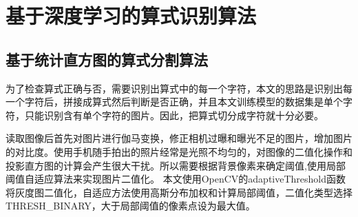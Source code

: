 \chapter{基于深度学习的算式识别算法}
\section{基于统计直方图的算式分割算法}
为了检查算式正确与否，需要识别出算式中的每一个字符，本文的思路是识别出每一个字符后，拼接成算式然后判断是否正确，并且本文训练模型的数据集是单个字符，只能识别含有单个字符的图片。因此，把算式切分成字符就十分必要。 
\par
读取图像后首先对图片进行伽马变换，修正相机过曝和曝光不足的图片，增加图片的对比度。使用手机随手拍出的照片经常是光照不均匀的，对图像的二值化操作和投影直方图的计算会产生很大干扰。所以需要根据背景像素来确定阈值,使用局部阈值自适应算法来实现图片二值化。 本文使用OpenCV的adaptiveThreshold函数将灰度图二值化，自适应方法使用高斯分布加权和计算局部阈值，二值化类型选择THRESH\_BINARY，大于局部阈值的像素点设为最大值。

